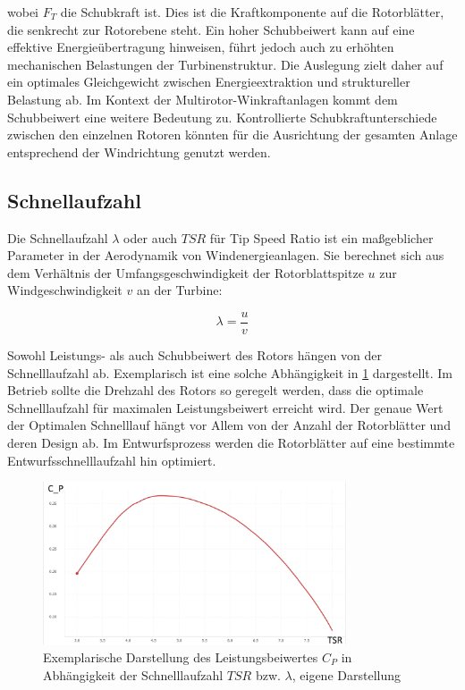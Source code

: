 wobei \( F_T \) die Schubkraft ist. Dies ist die Kraftkomponente auf die Rotorblätter, die senkrecht zur Rotorebene steht. Ein hoher Schubbeiwert kann auf eine effektive Energieübertragung hinweisen, führt jedoch auch zu erhöhten mechanischen Belastungen der Turbinenstruktur. Die Auslegung zielt daher auf ein optimales Gleichgewicht zwischen Energieextraktion und struktureller Belastung ab. Im Kontext der Multirotor-Winkraftanlagen kommt dem Schubbeiwert eine weitere Bedeutung zu. Kontrollierte Schubkraftunterschiede zwischen den einzelnen Rotoren könnten für die Ausrichtung der gesamten Anlage entsprechend der Windrichtung genutzt werden. 

\subsection{Schnellaufzahl}
Die Schnellaufzahl \( \lambda \) oder auch \( TSR \) für Tip Speed Ratio ist ein maßgeblicher Parameter in der Aerodynamik von Windenergieanlagen. Sie berechnet sich aus dem Verhältnis der Umfangsgeschwindigkeit der Rotorblattspitze \( u \) zur Windgeschwindigkeit \( v \) an der Turbine:

\begin{equation}
\lambda = \frac{u}{v}
\end{equation}

Sowohl Leistungs- als auch Schubbeiwert des Rotors hängen von der Schnelllaufzahl ab. Exemplarisch ist eine solche Abhängigkeit in \cref{fig:leistung_vs_TSR} dargestellt. Im Betrieb sollte die Drehzahl des Rotors so geregelt werden, dass die optimale Schnelllaufzahl für maximalen Leistungsbeiwert erreicht wird. Der genaue Wert der Optimalen Schnelllauf hängt vor Allem von der Anzahl der Rotorblätter und deren Design ab. Im Entwurfsprozess werden die Rotorblätter auf eine bestimmte Entwurfsschnelllaufzahl hin optimiert.

\begin{figure}[htbp] %
    \centering %
    \includegraphics[width=0.8\textwidth]{figures/leistung_vs_TSR.png} %
    \caption{Exemplarische Darstellung des Leistungsbeiwertes \( C_P\) in Abhängigkeit der Schnelllaufzahl \(TSR\) bzw. \( \lambda\), eigene Darstellung} %
    \label{fig:leistung_vs_TSR} %
\end{figure}

